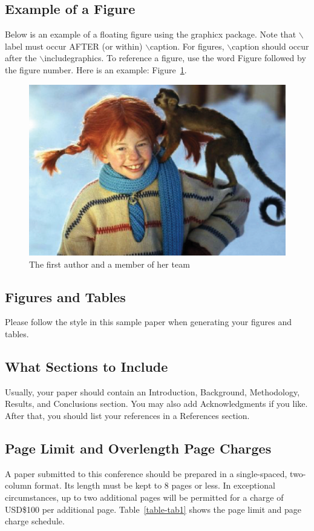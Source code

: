\documentclass[conference]{IEEEtran}
\begin{document}
\subsection{Example of a Figure}
Below is an example of a floating figure using the graphicx
package.  Note that $\backslash$label must occur AFTER (or within)
$\backslash$caption.  For figures, $\backslash$caption should occur
after the $\backslash$includegraphics.  To reference a figure, use
the word Figure followed by the figure number.  Here is an example:
Figure~\ref{figure-fig1}.

\begin{figure}[htp]
\centerline{\includegraphics[width=0.6\columnwidth]{pippi_langstrumpf.eps}}
\caption{The first author and a member of her team}
\label{figure-fig1}
\end{figure}

\subsection{Figures and Tables}
Please follow the style in this sample paper when generating your figures
and tables.

\subsection{What Sections to Include}
Usually, your paper should contain an Introduction, Background,
Methodology, Results, and Conclusions section.  You may also add
Acknowledgments if you like.  After that, you should list your references
in a References section.

\subsection{Page Limit and Overlength Page Charges}
A paper submitted to this conference should be prepared in a
single-spaced, two-column format.  Its length must be kept to 8
pages or less.  In exceptional circumstances, up to two additional
pages will be permitted for a charge of USD\$100 per additional page.
Table~\ref{table-tab1} shows the page limit and page charge schedule.
\end{document}
